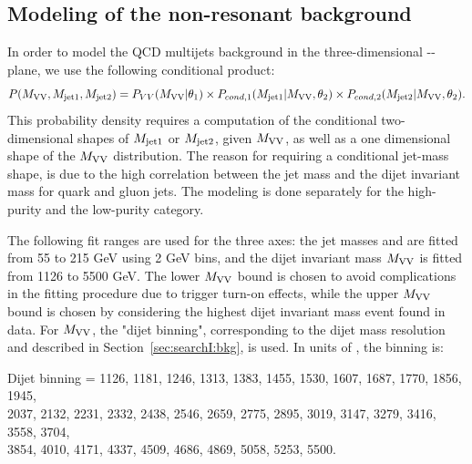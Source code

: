 \subsection{Modeling of the non-resonant background}
\label{sec:nonresbkgd}

In order to model the QCD multijets background in the three-dimensional \MVV-\MJO-\MJT plane, we use the following conditional product:
\begin{equation}
	\footnotesize
	P(M_{\rm VV},M_{\rm jet1},M_{\rm jet2}) = P_{VV}(M_{\rm VV}|\theta_1) \times P_{cond,1}(M_{\rm jet1}|M_{\rm VV},\theta_2) \times P_{cond,2}(M_{\rm jet2}|M_{\rm VV},\theta_2).
\end{equation} 
This probability density requires a computation of the conditional two-dimensional shapes of $M_{\rm jet1}$ or $M_{\rm jet2}$, given $M_{\rm VV}$, as well as a one dimensional shape of the $M_{\rm VV}$ distribution. The reason for requiring a conditional jet-mass shape, is due to the high correlation between the jet mass and the dijet invariant mass for quark and gluon jets. The modeling is done separately for the high-purity and the low-purity category.\par
The following fit ranges are used for the three axes: the jet masses \MJO and \MJT are fitted from 55 to 215 GeV using 2 GeV bins, and the dijet invariant mass $M_{\rm VV}$ is fitted from 1126 to 5500 GeV. The lower $M_{\rm VV}$ bound is chosen to avoid complications in the fitting procedure due to trigger turn-on effects, while the upper $M_{\rm VV}$ bound is chosen by considering the highest dijet invariant mass event found in data. For $M_{\rm VV}$, the "dijet binning", corresponding to the dijet mass resolution and described in Section~\ref{sec:searchI:bkg}, is used. In units of \GeV, the binning is:\newline


\noindent Dijet binning = 1126, 1181, 1246, 1313, 1383, 1455, 1530, 1607, 1687, 1770, 1856, 1945, \\
2037, 2132, 2231, 2332, 2438, 2546, 2659, 2775, 2895, 3019, 3147, 3279, 3416, 3558, 3704, \\
3854, 4010, 4171, 4337, 4509, 4686, 4869, 5058, 5253, 5500.\newline


